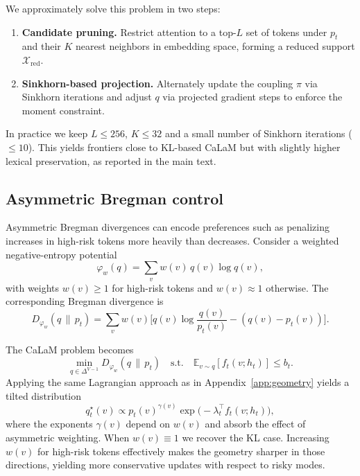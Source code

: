 \documentclass{article}
\theoremstyle{plain}
\theoremstyle{definition}
\theoremstyle{remark}
\begin{document}
We approximately solve this problem in two steps:

\begin{enumerate}[leftmargin=1.5em, itemsep=0pt]
  \item \textbf{Candidate pruning.}
  Restrict attention to a top-$L$ set of tokens under $p_t$ and their $K$ nearest neighbors in embedding space, forming a reduced support $\mathcal{X}_\text{red}$.

  \item \textbf{Sinkhorn-based projection.}
  Alternately update the coupling $\pi$ via Sinkhorn iterations and adjust $q$ via projected gradient steps to enforce the moment constraint.
\end{enumerate}

In practice we keep $L \le 256$, $K \le 32$ and a small number of Sinkhorn iterations ($\le 10$).
This yields frontiers close to KL-based CaLaM but with slightly higher lexical preservation, as reported in the main text.

\subsection{Asymmetric Bregman control}
\label{app:bregman}

Asymmetric Bregman divergences can encode preferences such as penalizing increases in high-risk tokens more heavily than decreases.
Consider a weighted negative-entropy potential
\begin{equation}
  \varphi_w(q)
  =
  \sum_v w(v)\, q(v)\log q(v),
\end{equation}
with weights $w(v) \ge 1$ for high-risk tokens and $w(v) \approx 1$ otherwise.
The corresponding Bregman divergence is
\begin{equation}
  D_{\varphi_w}(q \,\|\, p_t)
  =
  \sum_v w(v)
  \Big[
    q(v)\log\frac{q(v)}{p_t(v)} - (q(v)-p_t(v))
  \Big].
\end{equation}

The CaLaM problem becomes
\begin{equation}
  \min_{q \in \Delta^{V-1}} D_{\varphi_w}(q \,\|\, p_t)
  \quad \text{s.t.}\quad
  \mathbb{E}_{v \sim q}[f_t(v;h_t)] \le b_t.
\end{equation}
Applying the same Lagrangian approach as in Appendix~\ref{app:geometry} yields a tilted distribution
\begin{equation}
  q_t^\star(v)
  \propto
  p_t(v)^{\gamma(v)} \exp\big(-\lambda_t^\top f_t(v;h_t)\big),
\end{equation}
where the exponents $\gamma(v)$ depend on $w(v)$ and absorb the effect of asymmetric weighting.
When $w(v)\equiv 1$ we recover the KL case.
Increasing $w(v)$ for high-risk tokens effectively makes the geometry sharper in those directions, yielding more conservative updates with respect to risky modes.
\end{document}
